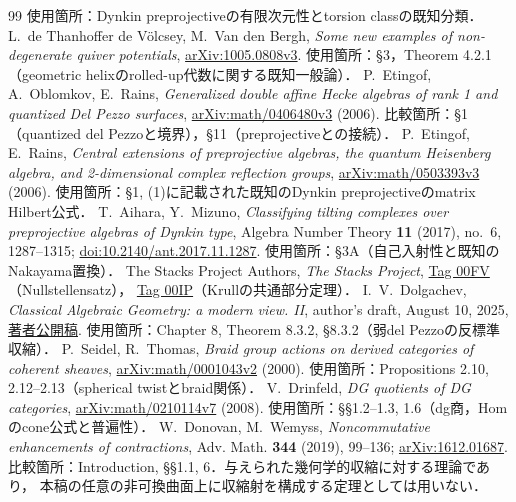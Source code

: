 \documentclass[11pt,a4paper]{ltjsarticle}
\theoremstyle{definition}
\begin{document}
\begin{thebibliography}{99}
使用箇所：Dynkin preprojectiveの有限次元性とtorsion classの既知分類．
L.~de Thanhoffer de V\"olcsey, M.~Van den Bergh,
\emph{Some new examples of non-degenerate quiver potentials},
\href{https://arxiv.org/abs/1005.0808v3}{arXiv:1005.0808v3}.
使用箇所：\S3，Theorem 4.2.1（geometric helixのrolled-up代数に関する既知一般論）．
P.~Etingof, A.~Oblomkov, E.~Rains,
\emph{Generalized double affine Hecke algebras of rank 1 and quantized Del Pezzo surfaces},
\href{https://arxiv.org/abs/math/0406480v3}{arXiv:math/0406480v3} (2006).
比較箇所：\S1（quantized del Pezzoと境界），\S11（preprojectiveとの接続）．
P.~Etingof, E.~Rains, \emph{Central extensions of preprojective algebras, the quantum Heisenberg algebra, and 2-dimensional complex reflection groups},
\href{https://arxiv.org/abs/math/0503393v3}{arXiv:math/0503393v3} (2006).
使用箇所：\S1, (1)に記載された既知のDynkin preprojectiveのmatrix Hilbert公式．
T.~Aihara, Y.~Mizuno, \emph{Classifying tilting complexes over preprojective algebras of Dynkin type},
Algebra Number Theory \textbf{11} (2017), no.~6, 1287--1315;
\href{https://doi.org/10.2140/ant.2017.11.1287}{doi:10.2140/ant.2017.11.1287}.
使用箇所：\S3A（自己入射性と既知のNakayama置換）．
The Stacks Project Authors, \emph{The Stacks Project},
\href{https://stacks.math.columbia.edu/tag/00FV}{Tag 00FV}（Nullstellensatz），
\href{https://stacks.math.columbia.edu/tag/00IP}{Tag 00IP}（Krullの共通部分定理）．
I.~V.~Dolgachev, \emph{Classical Algebraic Geometry: a modern view. II},
author's draft, August 10, 2025,
\href{https://sites.lsa.umich.edu/idolga/wp-content/uploads/sites/1467/2025/10/CAG-2.pdf}{著者公開稿}.
使用箇所：Chapter 8, Theorem 8.3.2, \S8.3.2（弱del Pezzoの反標準収縮）．
P.~Seidel, R.~Thomas, \emph{Braid group actions on derived categories of coherent sheaves},
\href{https://arxiv.org/abs/math/0001043}{arXiv:math/0001043v2} (2000).
使用箇所：Propositions 2.10, 2.12--2.13（spherical twistとbraid関係）．
V.~Drinfeld, \emph{DG quotients of DG categories},
\href{https://arxiv.org/abs/math/0210114}{arXiv:math/0210114v7} (2008).
使用箇所：\S\S1.2--1.3, 1.6（dg商，Homのcone公式と普遍性）．
W.~Donovan, M.~Wemyss, \emph{Noncommutative enhancements of contractions},
Adv. Math. \textbf{344} (2019), 99--136;
\href{https://arxiv.org/abs/1612.01687}{arXiv:1612.01687}.
比較箇所：Introduction, \S\S1.1, 6．与えられた幾何学的収縮に対する理論であり，
本稿の任意の非可換曲面上に収縮射を構成する定理としては用いない．
\end{thebibliography}
\end{document}
